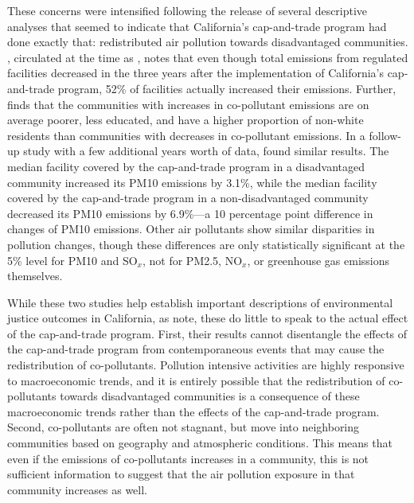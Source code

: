 These concerns were intensified following the release of several descriptive analyses that seemed to indicate that California's cap-and-trade program had done exactly that: redistributed air pollution towards disadvantaged communities. \cite{cushing2018carbon}, circulated at the time as \cite{cushing2016preliminary}, notes that even though total emissions from regulated facilities decreased in the three years after the implementation of California's cap-and-trade program, 52\% of facilities actually increased their emissions. Further, \cite{cushing2018carbon} finds that the communities with increases in co-pollutant emissions are on average poorer, less educated, and have a higher proportion of non-white residents than communities with decreases in co-pollutant emissions. In a follow-up study with a few additional years worth of data, \cite{pastor2022up} found similar results. The median facility covered by the cap-and-trade program in a disadvantaged community increased its PM10 emissions by 3.1\%, while the median facility covered by the cap-and-trade program in a non-disadvantaged community decreased its PM10 emissions by 6.9\%---a 10 percentage point difference in changes of PM10 emissions. Other air pollutants show similar disparities in pollution changes, though these differences are only statistically significant at the 5\% level for PM10 and SO$_x$, not for PM2.5, NO$_x$, or greenhouse gas emissions themselves. 

While these two studies help establish important descriptions of environmental justice outcomes in California, as \cite{hernandez2022importance} note, these do little to speak to the actual effect of the cap-and-trade program. First, their results cannot disentangle the effects of the cap-and-trade program from contemporaneous events that may cause the redistribution of co-pollutants. Pollution intensive activities are highly responsive to macroeconomic trends, and it is entirely possible that the redistribution of co-pollutants towards disadvantaged communities is a consequence of these macroeconomic trends rather than the effects of the cap-and-trade program. Second, co-pollutants are often not stagnant, but move into neighboring communities based on geography and atmospheric conditions. This means that even if the emissions of co-pollutants increases in a community, this is not sufficient information to suggest that the air pollution exposure in that community increases as well. 

